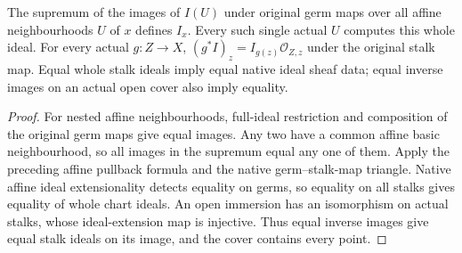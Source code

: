 \begin{lemma}
\label{lem:node-fitting-ideal-sheaf-stalks}
\leanok
The supremum of the images of $I(U)$ under original germ maps over all
affine neighbourhoods $U$ of $x$ defines $I_x$. Every such single actual
$U$ computes this whole ideal. For every actual $g:Z\to X$,
$(g^*I)_z=I_{g(z)}\mathcal O_{Z,z}$ under the original stalk map.
Equal whole stalk ideals imply equal native ideal sheaf data; equal
inverse images on an actual open cover also imply equality.
\end{lemma}
\begin{proof}
For nested affine neighbourhoods, full-ideal restriction and composition
of the original germ maps give equal images. Any two have a common affine
basic neighbourhood, so all images in the supremum equal any one of them.
Apply the preceding affine pullback formula and the native germ--stalk-map
triangle. Native affine ideal extensionality detects equality on germs,
so equality on all stalks gives equality of whole chart ideals. An open
immersion has an isomorphism on actual stalks, whose ideal-extension map
is injective. Thus equal inverse images give equal stalk ideals on its
image, and the cover contains every point.
\end{proof}

\endgroup

\begingroup

